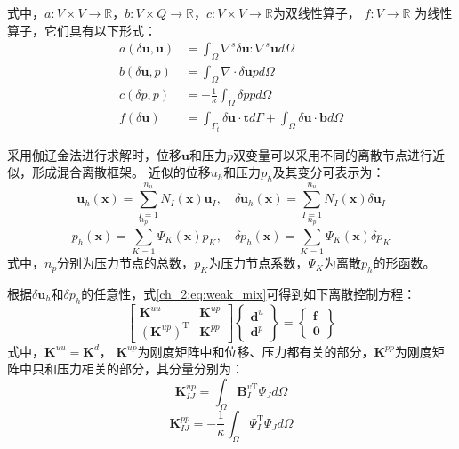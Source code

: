 式中，$a: V\times V\rightarrow \mathbb R$，$b: V\times Q\rightarrow \mathbb R$，$c: V\times V\rightarrow \mathbb R$为双线性算子， $f: V \rightarrow \mathbb R$ 为线性算子，它们具有以下形式：
\begin{align}
    a(\delta \boldsymbol u, \boldsymbol u) &= \int_\Omega \nabla^s \delta \boldsymbol u: \nabla^s \boldsymbol u d\Omega \\
    b(\delta \boldsymbol u, p) &= \int_\Omega \nabla \cdot \delta \boldsymbol u p d\Omega \\
    c(\delta p,p) &= -\frac{1}{\kappa}\int_\Omega\delta p p d\Omega \\
    f(\delta \boldsymbol u) &= \int_{\Gamma_t} \delta \boldsymbol u \cdot \boldsymbol t d\Gamma + \int_{\Omega} \delta \boldsymbol u \cdot \boldsymbol b d\Omega
\end{align}

采用伽辽金法进行求解时，位移$\boldsymbol u$和压力$p$双变量可以采用不同的离散节点进行近似，形成混合离散框架。
近似的位移$u_h$和压力$p_h$及其变分可表示为：
\begin{equation}\label{ch_2:eq:u_h_mix}
    \boldsymbol u_h(\boldsymbol x) = \sum_{I=1}^{n_u} N_I(\boldsymbol x) \boldsymbol u_I, \quad
    \delta \boldsymbol u_h(\boldsymbol x) = \sum_{I=1}^{n_u} N_I(\boldsymbol x) \delta \boldsymbol u_I
\end{equation}
\begin{equation}\label{ch_2:eq:p_h_mix}
    p_h(\boldsymbol x) = \sum_{K=1}^{n_p} \Psi_K(\boldsymbol x) p_K, \quad
    \delta p_h(\boldsymbol x) = \sum_{K=1}^{n_p} \Psi_K(\boldsymbol x) \delta p_K
\end{equation}
式中，$n_p$分别为压力节点的总数，$p_K$为压力节点系数，$\Psi_K$为离散$p_h$的形函数。

根据$\delta \boldsymbol  u_h$和$\delta p_h$的任意性，式\eqref{ch_2:eq:weak_mix}可得到如下离散控制方程：
\begin{equation}\label{equilibrium_mix}
    \begin{bmatrix}
        \boldsymbol K^{uu} & \boldsymbol K^{up} \\ (\boldsymbol K^{up})^{\mathrm T} & \boldsymbol K^{pp}
    \end{bmatrix}
    \begin{Bmatrix}
        \boldsymbol d^u \\ \boldsymbol d^p 
    \end{Bmatrix} =
    \begin{Bmatrix}
        \boldsymbol f \\ \boldsymbol 0 
    \end{Bmatrix}
\end{equation}
式中，$\boldsymbol K^{uu} = \boldsymbol K^d$， $\boldsymbol{K}^{up}$为刚度矩阵中和位移、压力都有关的部分，$\boldsymbol{K}^{pp}$为刚度矩阵中只和压力相关的部分，其分量分别为：
\begin{equation}
    \boldsymbol{K}^{up}_{I J}=\int_{\Omega} \boldsymbol B_{I}^{v\mathrm T} \Psi_{J} {d} \Omega
\end{equation}
\begin{equation}  
    \boldsymbol{K}^{pp}_{IJ}=-\frac{1}{\kappa}\int_{\Omega}  \Psi^\mathrm{T}_{I}  \Psi_{J}d\Omega
\end{equation}

